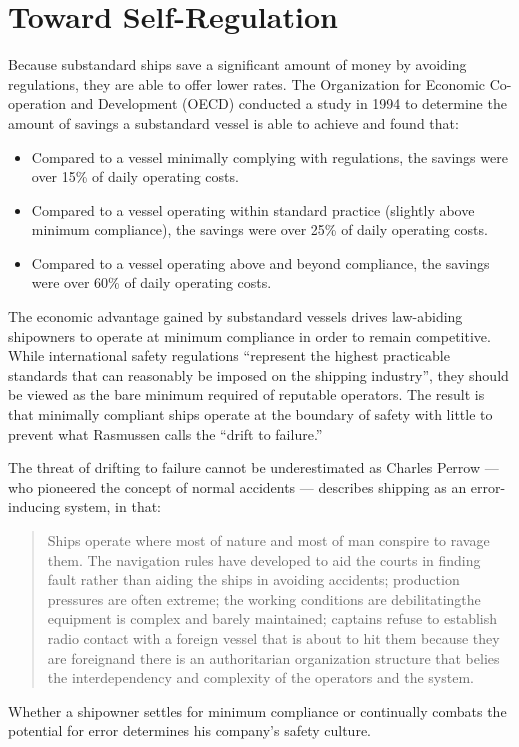 \documentclass[twoside,symmetric,notoc]{tufte-book}
\begin{document}
\section{Toward Self-Regulation}
\par{%
Because substandard ships save a significant amount of money by avoiding regulations, they are able to offer lower rates.\cite{OECD_2002} The Organization for Economic Co-operation and Development (OECD) conducted a study in 1994 to determine the amount of savings a substandard vessel is able to achieve and found that:\cite{OECD_1996}
\begin{itemize}
\item Compared to a vessel minimally complying with regulations, the savings were over 15\% of daily operating costs.
\item Compared to a vessel operating within standard practice (slightly above minimum compliance), the savings were over 25\% of daily operating costs.
\item Compared to a vessel operating above and beyond compliance, the savings were over 60\% of daily operating costs.
\end{itemize}
The economic advantage gained by substandard vessels drives law-abiding shipowners to operate at minimum compliance in order to remain competitive. While international safety regulations ``represent the highest practicable standards that can reasonably be imposed on the shipping industry'', they should be viewed as the bare minimum required of reputable operators.\cite[-0.6in]{Reynolds}  The result is that minimally compliant ships operate at the boundary of safety with little to prevent what Rasmussen calls the ``drift to failure.''\cite[-0.14in]{Rasmussen}
}
\par{%
The threat of drifting to failure cannot be underestimated as Charles Perrow --- who pioneered the concept of normal accidents --- describes shipping as an error-inducing system, in that:\cite[-0.2in]{Perrow}
\begin{quotation}
Ships operate where most of nature and most of man conspire to ravage them. The navigation rules have developed to aid the courts in finding fault rather than aiding the ships in avoiding accidents; production pressures are often extreme; the working conditions are debilitating\textellipsis the equipment is complex and barely maintained; captains refuse to establish radio contact with a foreign vessel that is about to hit them because they are foreign\textellipsis and there is an authoritarian organization structure that belies the interdependency and complexity of the operators and the system.
\end{quotation}
Whether a shipowner settles for minimum compliance or continually combats the potential for error determines his company's safety culture.
}
\end{document}
